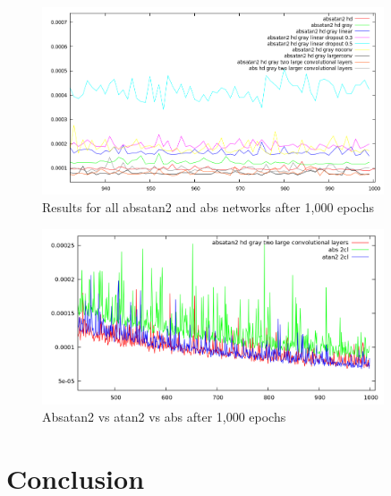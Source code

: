 \documentclass[11pt, a4paper]{article}
\begin{document}
\begin{figure}[htbp]
	\centering
	\includegraphics[width=0.9\textwidth]{results/absatan2_and_abs_1.png}
	\caption{Results for all absatan2 and abs networks after 1,000 epochs}
	\label{fig:absatan2_results}
\end{figure}

\begin{figure}[htbp]
	\centering
	\includegraphics[width=0.9\textwidth]{results/gabor_absatan2_vs_atan2_vs_abs.png}
	\caption{Absatan2 vs atan2 vs abs after 1,000 epochs}
	\label{fig:gabor_absatan2_vs_atan2_vs_abs}
\end{figure}


\newpage


\section{Conclusion}
\label{sec:conclusion}
\end{document}
